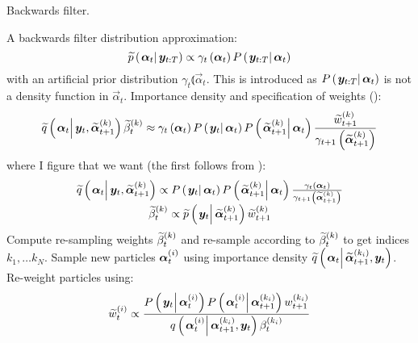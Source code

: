\begin{algorithm}
\caption{Backwards filter.}\label{alg:backward}
\begin{algorithmic}[1]\raggedright
\INPUT
\Statex A backwards filter distribution approximation:
\begin{equation}
	\propAproxC{\vec{\alpha}_t}{\vec{y}_{t:T}} \propto \gamma_t \Lparen{\vec{\alpha}_t}\propC{\vec{y}_{t:T}}{\vec{\alpha}_t}
\end{equation} 
\Statex with an  artificial prior distribution $\gamma_t \Lparen{\vec{\alpha}_t}$. This is introduced as $\propC{\vec{y}_{t:T}}{\vec{\alpha}_t}$ is not a density function in $\vec{\alpha}_t$.
\Statex Importance density and specification of weights {\footnotesize (\citet[page 451  -- maybe look in the example in the appendix]{fearnhead10})}:
\Statex\begin{equation}
	\IDAproxC{\vec{\alpha}_t}{\vec{y}_t, \particB{\vec{\alpha}}{t + 1}{k}}\particB{\beta}{t}{k} \approx %
		\gamma_t\Lparen{\vec{\alpha}_t}
		\propC{\vec{y}_t}{\vec{\alpha}_t}
		\propC{\particB{\vec{\alpha}}{t + 1}{k}}{\vec{\alpha}_t}
		\frac{\particB{w}{t + 1}{k}}{\gamma_{t + 1}\Lparen{\particB{\vec{\alpha}}{t + 1}{k}}}
\end{equation}
\Statex where I figure that we want {\footnotesize (the first follows from \citet[page 74]{briers10})}:
\Statex\begin{equation}\begin{matrix}
	\IDAproxC{\vec{\alpha}_t}{\vec{y}_t, \particB{\vec{\alpha}}{t + 1}{k}} \propto %
		\propC{\vec{y}_t}{\vec{\alpha}_t}
		\propC{\particB{\vec{\alpha}}{t + 1}{k}}{\vec{\alpha}_t}
		\frac{\gamma_t\Lparen{\vec{\alpha}_t}}{\gamma_{t + 1}\Lparen{\particB{\vec{\alpha}}{t + 1}{k}}} \\
	\particB{\beta}{t}{k} \propto %
		 \propAproxC{\vec{y}_t}{\particB{\vec{\alpha}}{t + 1}{k}}\particB{w}{t + 1}{k}
\end{matrix}\end{equation}
\State Compute re-sampling weights $\widetilde{\beta}_{t}^{\left( k\right)}$ and re-sample according to $\widetilde{\beta}_{t}^{\left( k\right)}$ to get indices $k_1,\dots k_N$.
\EndProcedure
%
\State Sample new particles $\bm{\alpha}_{t}^{\left( i\right)}$ using importance density $\IDAproxC{\vec{\alpha}_t}{\particB{\vec{\alpha}}{t + 1}{k_i}, \vec{y}_t}$.
\EndProcedure
%
\State Re-weight particles using:
\StateX \begin{equation}\label{eqn:backwardWeight}
	\particB{w}{t}{i} \propto \frac{
		\propC{\vec{y}_t}{\partic{\vec{\alpha}}{t}{i}}
		\propC{\partic{\vec{\alpha}}{t}{i}}{\partic{\vec{\alpha}}{t + 1}{k_i}}
		\partic{w}{t + 1}{k_i}
	}{ %
		\IDC{\partic{\vec{\alpha}}{t}{i}}{\partic{\vec{\alpha}}{t + 1}{k_i}, \vec{y}_t}
		\partic{\beta}{t}{k_i}
	}
\end{equation}
\EndProcedure
\EndFor
\end{algorithmic}
\end{algorithm}
